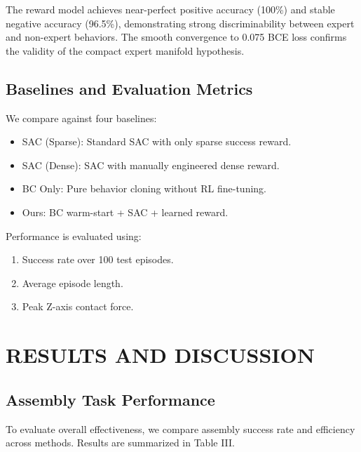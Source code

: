\documentclass[conference]{IEEEtran}
\begin{document}
The reward model achieves near-perfect positive accuracy (100\%) and stable negative accuracy (96.5\%), demonstrating strong discriminability between expert and non-expert behaviors. The smooth convergence to 0.075 BCE loss confirms the validity of the compact expert manifold hypothesis.

\subsection{Baselines and Evaluation Metrics}
We compare against four baselines:
\begin{itemize}
    \item SAC (Sparse): Standard SAC with only sparse success reward.
    \item SAC (Dense): SAC with manually engineered dense reward.
    \item BC Only: Pure behavior cloning without RL fine-tuning.
    \item Ours: BC warm-start + SAC + learned reward.
\end{itemize}

Performance is evaluated using:
\begin{enumerate}
    \item Success rate over 100 test episodes.
    \item Average episode length.
    \item Peak Z-axis contact force.
\end{enumerate}\section{RESULTS AND DISCUSSION}
\subsection{Assembly Task Performance}
To evaluate overall effectiveness, we compare assembly success rate and efficiency across methods. Results are summarized in Table III.

\begin{table}[h]
\centering
\caption{Performance Comparison on Timber Assembly Task}
\label{tab:overall_performance}
\end{table}
\end{document}

